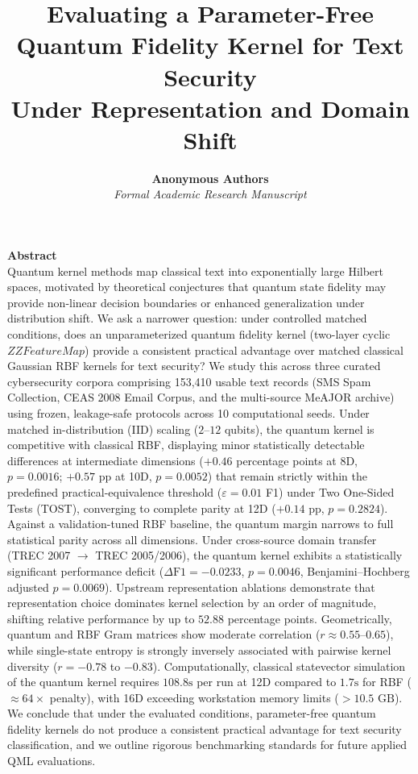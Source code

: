 \documentclass{article}
\title{\LARGE \textbf{Evaluating a Parameter-Free Quantum Fidelity Kernel for Text Security\\Under Representation and Domain Shift}}
\author{
  \textbf{Anonymous Authors} \\
  \textit{Formal Academic Research Manuscript}
}
\date{}
\begin{document}
\maketitle

\noindent\textbf{\large Abstract} \\
\noindent Quantum kernel methods map classical text into exponentially large Hilbert spaces, motivated by theoretical conjectures that quantum state fidelity may provide non-linear decision boundaries or enhanced generalization under distribution shift. We ask a narrower question: under controlled matched conditions, does an unparameterized quantum fidelity kernel (two-layer cyclic $ZZFeatureMap$) provide a consistent practical advantage over matched classical Gaussian RBF kernels for text security? We study this across three curated cybersecurity corpora comprising 153,410 usable text records (SMS Spam Collection, CEAS 2008 Email Corpus, and the multi-source MeAJOR archive) using frozen, leakage-safe protocols across 10 computational seeds. Under matched in-distribution (IID) scaling ($2\text{--}12$ qubits), the quantum kernel is competitive with classical RBF, displaying minor statistically detectable differences at intermediate dimensions ($+0.46$ percentage points at 8D, $p = 0.0016$; $+0.57$ pp at 10D, $p = 0.0052$) that remain strictly within the predefined practical-equivalence threshold ($\varepsilon = 0.01$ F1) under Two One-Sided Tests (TOST), converging to complete parity at 12D ($+0.14$ pp, $p = 0.2824$). Against a validation-tuned RBF baseline, the quantum margin narrows to full statistical parity across all dimensions. Under cross-source domain transfer (TREC 2007 $\to$ TREC 2005/2006), the quantum kernel exhibits a statistically significant performance deficit ($\Delta\text{F1} = -0.0233$, $p = 0.0046$, Benjamini--Hochberg adjusted $p = 0.0069$). Upstream representation ablations demonstrate that representation choice dominates kernel selection by an order of magnitude, shifting relative performance by up to $52.88$ percentage points. Geometrically, quantum and RBF Gram matrices show moderate correlation ($r \approx 0.55\text{--}0.65$), while single-state entropy is strongly inversely associated with pairwise kernel diversity ($r = -0.78$ to $-0.83$). Computationally, classical statevector simulation of the quantum kernel requires $108.8\text{s}$ per run at 12D compared to $1.7\text{s}$ for RBF ($\approx 64\times$ penalty), with 16D exceeding workstation memory limits ($>10.5\text{ GB}$). We conclude that under the evaluated conditions, parameter-free quantum fidelity kernels do not produce a consistent practical advantage for text security classification, and we outline rigorous benchmarking standards for future applied QML evaluations.
\end{document}
